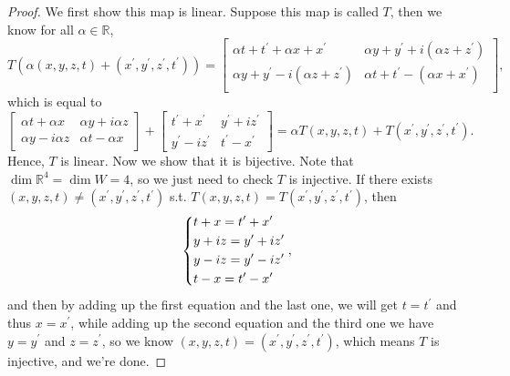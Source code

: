 \begin{proof}
    We first show this map is linear. Suppose this map is called \(T\), then we know for all \(\alpha \in \mathbb{R} \), 
    \[
        T\left( \alpha (x, y, z, t) + \left( x^{\prime} , y^{\prime} , z^{\prime} , t^{\prime}  \right)  \right) = \begin{bmatrix}
            \alpha t + t^{\prime} + \alpha x + x^{\prime}  & \alpha y + y^{\prime} + i(\alpha z + z^{\prime} )  \\
            \alpha y + y^{\prime}  - i(\alpha z + z^{\prime} ) & \alpha t + t^{\prime} - (\alpha x + x^{\prime} )  \\
        \end{bmatrix},
    \]  which is equal to 
    \[
        \begin{bmatrix}
            \alpha t + \alpha x  & \alpha y + i \alpha z  \\
            \alpha y - i \alpha z   & \alpha t - \alpha x 
        \end{bmatrix} + \begin{bmatrix}
            t^{\prime}  + x^{\prime}  & y^{\prime} + i z^{\prime}  \\
            y^{\prime}  - i z^{\prime}  & t^{\prime} - x^{\prime} 
        \end{bmatrix} = \alpha T(x,y,z,t) + T\left( x^{\prime} , y^{\prime} , z^{\prime} ,  t^{\prime}  \right). 
    \] Hence, \(T\) is linear. Now we show that it is bijective. Note that \(\dim \mathbb{R} ^4 = \dim W = 4\), so we just need to check \(T\) is injective. If there exists \((x, y, z, t) \neq (x^{\prime} ,y^{\prime} ,z^{\prime} ,t^{\prime} )\) s.t. \(T(x,y,z,t) = T(x^{\prime} , y^{\prime} , z^{\prime} , t^{\prime} )\), then  
    \[
        \begin{dcases}
            t + x = t^{\prime} + x^{\prime} \\
            y + iz = y^{\prime} + iz^{\prime} \\ 
            y - iz = y^{\prime}  - iz^{\prime} \\
            t - x = t^{\prime}  - x^{\prime} 
        \end{dcases},
    \]   
    and then by adding up the first equation and the last one, we will get \(t = t^{\prime} \) and thus \(x = x^{\prime} \), while adding up the second equation and the third one we have \(y = y^{\prime} \) and \(z = z^{\prime} \), so we know \((x, y, z, t) = \left( x^{\prime} , y^{\prime} , z^{\prime} , t^{\prime}  \right) \), which means \(T\) is injective, and we're done.     
\end{proof}